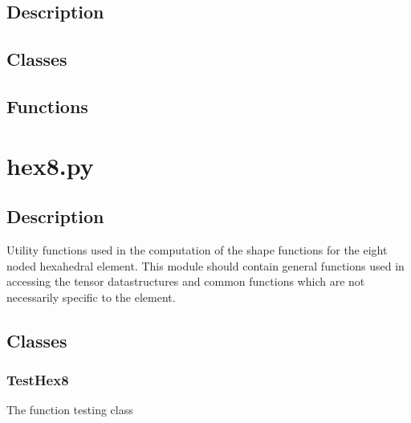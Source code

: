 \documentclass{asme2ej}
\begin{document}
\subsection{Description}

\subsection{Classes}

\subsection{Functions}

\section{hex8.py}

\subsection{Description}

Utility functions used in the computation of the shape functions for the eight noded hexahedral element. This module should contain general functions used in accessing the tensor datastructures and common functions which are not necessarily specific to the element.

\subsection{Classes}

\subsubsection{TestHex8}

The function testing class
\end{document}
